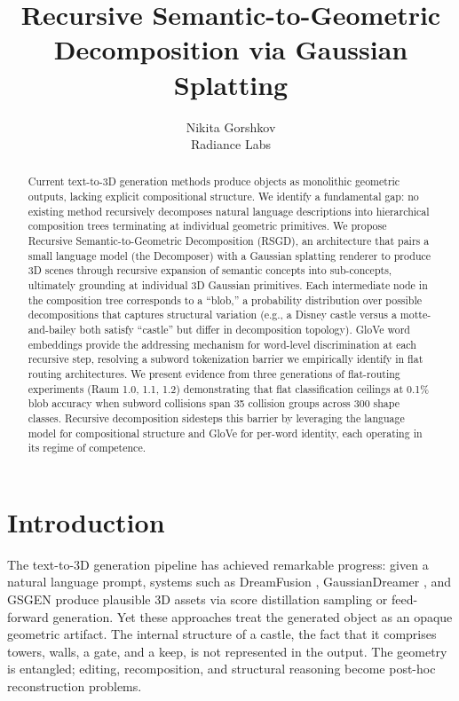 \documentclass[11pt]{article}
\title{Recursive Semantic-to-Geometric Decomposition via Gaussian Splatting}
\author{Nikita Gorshkov \\ Radiance Labs}
\date{}
\begin{document}
\maketitle

\begin{abstract}
Current text-to-3D generation methods produce objects as monolithic geometric outputs, lacking explicit compositional structure. We identify a fundamental gap: no existing method recursively decomposes natural language descriptions into hierarchical composition trees terminating at individual geometric primitives. We propose Recursive Semantic-to-Geometric Decomposition (RSGD), an architecture that pairs a small language model (the Decomposer) with a Gaussian splatting renderer to produce 3D scenes through recursive expansion of semantic concepts into sub-concepts, ultimately grounding at individual 3D Gaussian primitives. Each intermediate node in the composition tree corresponds to a ``blob,'' a probability distribution over possible decompositions that captures structural variation (e.g., a Disney castle versus a motte-and-bailey both satisfy ``castle'' but differ in decomposition topology). GloVe word embeddings provide the addressing mechanism for word-level discrimination at each recursive step, resolving a subword tokenization barrier we empirically identify in flat routing architectures. We present evidence from three generations of flat-routing experiments (Raum 1.0, 1.1, 1.2) demonstrating that flat classification ceilings at 0.1\% blob accuracy when subword collisions span 35 collision groups across 300 shape classes. Recursive decomposition sidesteps this barrier by leveraging the language model for compositional structure and GloVe for per-word identity, each operating in its regime of competence.
\end{abstract}

\section{Introduction}

The text-to-3D generation pipeline has achieved remarkable progress: given a natural language prompt, systems such as DreamFusion \cite{poole2023}, GaussianDreamer \cite{yi2024}, and GSGEN \cite{chen2024gsgen} produce plausible 3D assets via score distillation sampling or feed-forward generation. Yet these approaches treat the generated object as an opaque geometric artifact. The internal structure of a castle, the fact that it comprises towers, walls, a gate, and a keep, is not represented in the output. The geometry is entangled; editing, recomposition, and structural reasoning become post-hoc reconstruction problems.
\end{document}
